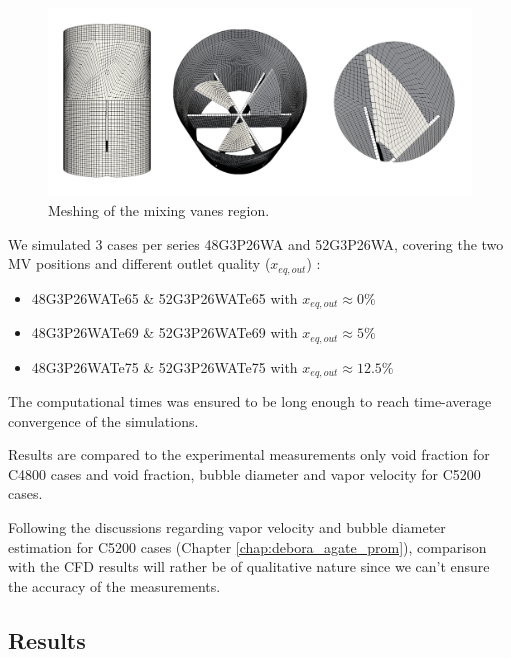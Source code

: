 %
\begin{figure}[!h]
\centering
\includegraphics[width=1.0\linewidth]{img/DEBORA-Promoteur/cfd/prom_M2_all.png}
\caption{Meshing of the mixing vanes region.}
\label{fig:prom_M2}
\end{figure}
%

\npar


We simulated 3 cases per series 48G3P26WA and 52G3P26WA, covering the two MV positions and different outlet quality ($x_{eq,out}$) :

\begin{itemize}
\item 48G3P26WATe65 \& 52G3P26WATe65 with $x_{eq,out}\approx 0\%$ 
\item 48G3P26WATe69 \& 52G3P26WATe69 with $x_{eq,out}\approx 5\%$ 
\item 48G3P26WATe75 \& 52G3P26WATe75 with $x_{eq,out}\approx 12.5\%$ 
\end{itemize}

\begin{note*}{}
The computational times was ensured to be long enough to reach time-average convergence of the simulations.
\end{note*}


Results are compared to the experimental measurements \ie only void fraction for C4800 cases and void fraction, bubble diameter and vapor velocity for C5200 cases.

\begin{remark*}{}
Following the discussions regarding vapor velocity and bubble diameter estimation for C5200 cases (Chapter \ref{chap:debora_agate_prom}), comparison with the CFD results will rather be of qualitative nature since we can't ensure the accuracy of the measurements.
\end{remark*}


\subsection{Results}

